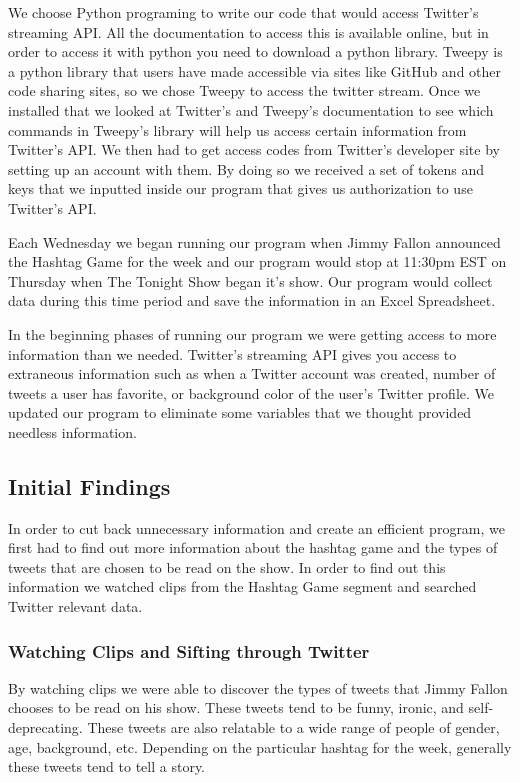 \documentclass[titlepage]{article}
\begin{document}
We choose Python programing to write our code that would access Twitter's streaming API. All the documentation to access this is available online, but in order to access it with python you need to download a python library. Tweepy is a python library that users have made accessible via sites like GitHub and other code sharing sites, so we chose Tweepy to access the twitter stream. Once we installed that we looked at Twitter's and Tweepy's documentation to see which commands in Tweepy's library will help us access certain information from Twitter's API. We then had to get access codes from Twitter's developer site by setting up an account with them. By doing so we received a set of tokens and keys that we inputted inside our program that gives us authorization to use Twitter's API. 

Each Wednesday we began running our program when Jimmy Fallon announced the Hashtag Game for the week and our program would stop at 11:30pm EST on Thursday when The Tonight Show began it's show. Our program would collect data during this time period and save the information in an Excel Spreadsheet. 

In the beginning phases of running our program we were getting access to more information than we needed. Twitter's streaming API gives you access to extraneous information such as when a Twitter account was created, number of tweets a user has favorite, or background color of the user's Twitter profile. We updated our program to eliminate some variables that we thought provided needless information. 

\subsection{Initial Findings}

In order to cut back unnecessary information and create an efficient program, we first had to find out more information about the hashtag game and the types of tweets that are chosen to be read on the show. In order to find out this information we watched clips from the Hashtag Game segment and searched Twitter relevant data.  


\subsubsection{Watching Clips and Sifting through Twitter}

By watching clips we were able to discover the types of tweets that Jimmy Fallon chooses to be read on his show. These tweets tend to be funny, ironic, and self-deprecating. These tweets are also relatable to a wide range of people of gender, age, background, etc. Depending on the particular hashtag for the week, generally these tweets tend to tell a story. 
\end{document}
